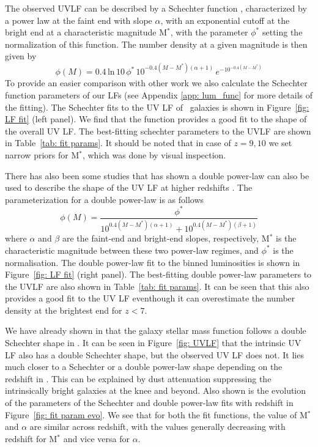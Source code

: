 The observed UVLF can be described by a Schechter function \citep[\eg][]{Bouwens_2015a,Finkelstein2015}, characterized by a power law at the faint end with slope $\alpha$, with an exponential cutoff at the bright end at a characteristic magnitude M$^*$, with the parameter $\phi^*$ setting the normalization of this function. The number density at a given magnitude is then given by
\begin{equation}\label{eq: schechter}
\phi(M) = 0.4\,\text{ln}\,10\,\phi^{*}\,10^{-0.4(M-M^*)(\alpha+1)}\,e^{-10^{-0.4(M-M^*)}} 
\end{equation}
To provide an easier comparison with other work we also calculate the Schechter function parameters of our LFs (see Appendix \ref{app: lum_func} for more details of the fitting). The Schechter fits to the UV LF of \flares\, galaxies is shown in Figure~\ref{fig: LF fit} (left panel). We find that the function provides a good fit to the shape of the overall UV LF. The best-fitting schechter parameters to the UVLF are shown in Table~\ref{tab: fit params}. It should be noted that in case of $z=9,10$ we set narrow priors for M$^*$, which was done by visual inspection.

There has also been some studies that has shown a double power-law can also be used to describe the shape of the UV LF at higher redshifts \citep[\eg][]{Bowler2014}. The parameterization for a double power-law is as follows
\begin{equation}\label{eq: DPL}
	\phi(M)  = \frac{\phi^*}{10^{0.4(M-M^*)(\alpha+1)} + 10^{0.4(M-M^*)(\beta+1)}}
\end{equation}
where $\alpha$ and $\beta$ are the faint-end and bright-end slopes,
respectively, M$^*$ is the characteristic magnitude between these two power-law regimes, and $\phi^*$ is the normalisation. The double power-law fit to the binned luminosities is shown in Figure~\ref{fig: LF fit} (right panel). The best-fitting double power-law parameters to the UVLF are also shown in Table~\ref{tab: fit params}. It can be seen that this also provides a good fit to the UV LF eventhough it can overestimate the number density at the brightest end for $z<7$.

We have already shown in  that the galaxy stellar mass function follows a double Schechter shape in \flares. It can be seen in Figure~\ref{fig: UVLF} that the intrinsic UV LF also has a double Schechter shape, but the observed UV LF does not. It lies much closer to a Schechter or a double power-law shape depending on the redshift in \flares. This can be explained by dust attenuation suppressing the intrinsically bright galaxies at the knee and beyond. Also shown is the evolution of the parameters of the Schechter and double power-law fits with redshift in Figure~\ref{fig: fit param evo}. We see that for both the fit functions, the value of M$^*$ and $\alpha$ are similar across redshift, with the values generally decreasing with redshift for M$^*$ and vice versa for $\alpha$. 

